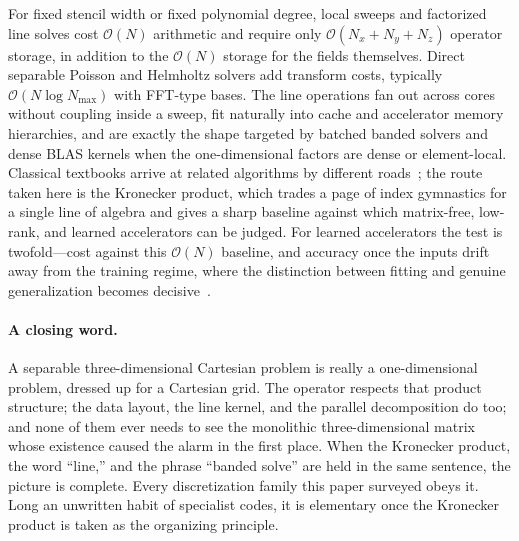 \documentclass[11pt]{article}
\newcommand{\bigO}{\mathcal{O}}
\newcommand{\Nall}{N}
\begin{document}
For fixed stencil width or fixed polynomial degree, local sweeps and
factorized line solves cost $\bigO(\Nall)$ arithmetic and require only
$\bigO(N_x+N_y+N_z)$ operator storage, in addition to the
$\bigO(\Nall)$ storage for the fields themselves.  Direct separable
Poisson and Helmholtz solvers add transform costs, typically
$\bigO(\Nall\log N_{\max})$ with FFT-type bases.  The line operations
fan out across cores without coupling inside a sweep, fit naturally
into cache and accelerator memory hierarchies, and are exactly the
shape targeted by batched banded solvers and dense BLAS kernels when
the one-dimensional factors are dense or element-local.  Classical
textbooks arrive at related algorithms by different
roads~\citep{hirsch2007numerical,leveque2007finite,iserles2009first};
the route taken here is the Kronecker product, which trades a page of
index gymnastics for a single line of algebra and gives a sharp
baseline against which matrix-free, low-rank, and learned accelerators
can be judged.  For learned accelerators the test is twofold---cost
against this $\bigO(\Nall)$ baseline, and accuracy once the inputs drift
away from the training regime, where the distinction between fitting and
genuine generalization becomes decisive~\citep{bay2024generalization}.

\paragraph{A closing word.}
A separable three-dimensional Cartesian problem is really a
one-dimensional problem, dressed up for a Cartesian grid.  The
operator respects that product structure; the data layout, the line
kernel, and the parallel decomposition do too; and none of them ever
needs to see the monolithic three-dimensional matrix whose existence
caused the alarm in the first place.  When the Kronecker product,
the word ``line,'' and the phrase ``banded solve'' are held in the
same sentence, the picture is complete.  Every discretization family
this paper surveyed obeys it.  Long an unwritten habit of specialist
codes, it is elementary once the Kronecker product is taken as the
organizing principle.



\end{document}
